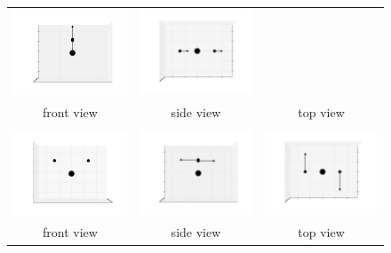 \documentclass[11pt]{article}
\begin{document}
\begin{figure}[htp]
\begin{tabular}{|ccc|}
	\includegraphics[width=5.5cm,clip=true,trim=3cm 2cm 3cm 2cm]{images/0-90_4.pdf}&
	\includegraphics[width=5.5cm,clip=true,trim=3cm 2cm 3cm 2cm]{images/90-0_4.pdf}\\front view&side view&top view\\\hline&&\\
	\includegraphics[width=5.5cm,clip=true,trim=3cm 2cm 3cm 2cm]{images/0-0_5.pdf}&
	\includegraphics[width=5.5cm,clip=true,trim=3cm 2cm 3cm 2cm]{images/0-90_5.pdf}&
	\includegraphics[width=5.5cm,clip=true,trim=3cm 2cm 3cm 2cm]{images/90-0_5.pdf}\\front view&side view&top view\\\hline
	\end{tabular}
\end{figure}
\newpage
\end{document}
